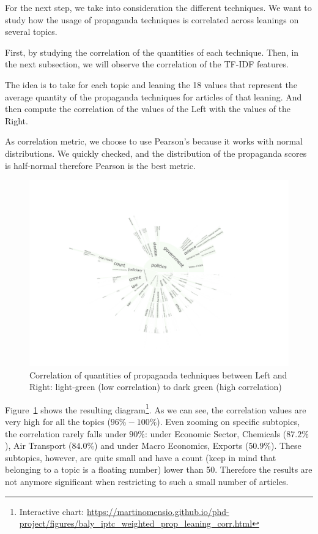 


For the next step, we take into consideration the different techniques. We want to study how the usage of propaganda techniques is correlated across leanings on several topics.

First, by studying the correlation of the quantities of each technique. Then, in the next subsection, we will observe the correlation of the TF-IDF features.

The idea is to take for each topic and leaning the 18 values that represent the average quantity of the propaganda techniques for articles of that leaning. And then compute the correlation of the values of the Left with the values of the Right.

As correlation metric, we choose to use Pearson's because it works with normal distributions. We quickly checked, and the distribution of the propaganda scores is half-normal therefore Pearson is the best metric.

\begin{figure}[!htbp]
    \centering
    \includegraphics[trim={2.2cm 2cm 2.2cm 2cm},clip,width=\linewidth]{figures/baly_iptc_weighted_prop_leaning_corr.pdf}
    \caption{Correlation of quantities of propaganda techniques between Left and Right: light-green (low correlation) to dark green (high correlation)}
    \label{fig:baly_iptc_weighted_prop_leaning_corr}
\end{figure}

Figure~\ref{fig:baly_iptc_weighted_prop_leaning_corr} shows the resulting diagram\footnote{Interactive chart: \url{https://martinomensio.github.io/phd-project/figures/baly_iptc_weighted_prop_leaning_corr.html}}. As we can see, the correlation values are very high for all the topics ($96\% - 100\%$). Even zooming on specific subtopics, the correlation rarely falls under $90\%$: under Economic Sector, Chemicals ($87.2\%$), Air Transport ($84.0\%$) and under Macro Economics, Exports ($50.9\%$). 
These subtopics, however, are quite small and have a count (keep in mind that belonging to a topic is a floating number) lower than 50. Therefore the results are not anymore significant when restricting to such a small number of articles.

